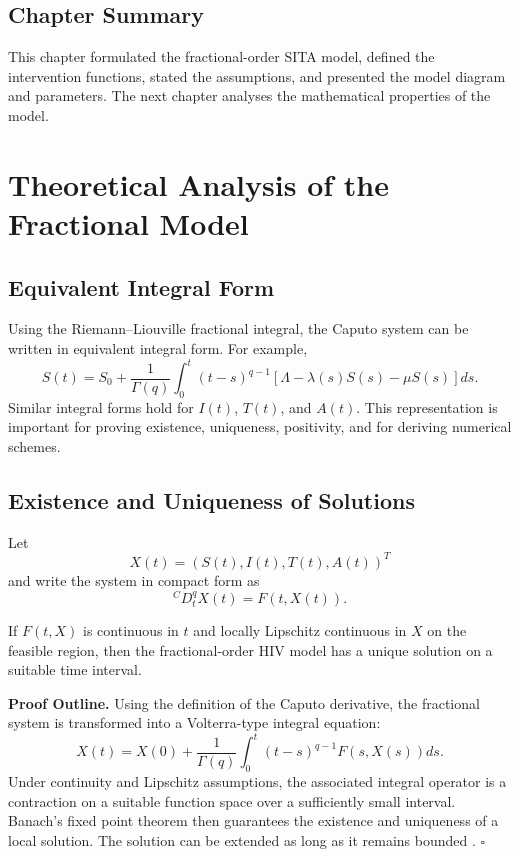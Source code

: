 \documentclass[12pt,a4paper,oneside]{report}
\newcommand{\CaputoD}[2]{{}^{C}D_{#1}^{#2}}
\begin{document}
\section{Chapter Summary}
This chapter formulated the fractional-order SITA model, defined the intervention functions, stated the assumptions, and presented the model diagram and parameters. The next chapter analyses the mathematical properties of the model.

\chapter{Theoretical Analysis of the Fractional Model}

\section{Equivalent Integral Form}
Using the Riemann--Liouville fractional integral, the Caputo system can be written in equivalent integral form. For example,
\begin{equation}
S(t)=S_0+\frac{1}{\Gamma(q)}\int_0^t (t-s)^{q-1}\left[\Lambda-\lambda(s)S(s)-\mu S(s)\right]ds.
\end{equation}
Similar integral forms hold for $I(t)$, $T(t)$, and $A(t)$. This representation is important for proving existence, uniqueness, positivity, and for deriving numerical schemes.

\section{Existence and Uniqueness of Solutions}
Let
\[
X(t)=(S(t),I(t),T(t),A(t))^T
\]
and write the system in compact form as
\[
\CaputoD{t}{q}X(t)=F(t,X(t)).
\]

\begin{resultbox}[title={Existence and Uniqueness}]
If $F(t,X)$ is continuous in $t$ and locally Lipschitz continuous in $X$ on the feasible region, then the fractional-order HIV model has a unique solution on a suitable time interval.
\end{resultbox}

\noindent\textbf{Proof Outline.}
Using the definition of the Caputo derivative, the fractional system is transformed into a Volterra-type integral equation:
\[
X(t)=X(0)+\frac{1}{\Gamma(q)}\int_0^t(t-s)^{q-1}F(s,X(s))ds.
\]
Under continuity and Lipschitz assumptions, the associated integral operator is a contraction on a suitable function space over a sufficiently small interval. Banach's fixed point theorem then guarantees the existence and uniqueness of a local solution. The solution can be extended as long as it remains bounded \citep{Kilbas2006,Diethelm2010}. \hfill$\square$
\end{document}
